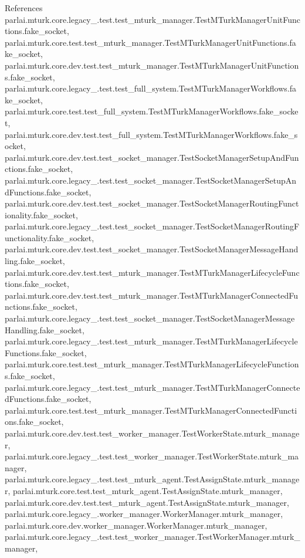 References parlai.\+mturk.\+core.\+legacy\+\_.\+test.\+test\+\_\+mturk\+\_\+manager.\+Test\+M\+Turk\+Manager\+Unit\+Functions.\+fake\+\_\+socket, parlai.\+mturk.\+core.\+test.\+test\+\_\+mturk\+\_\+manager.\+Test\+M\+Turk\+Manager\+Unit\+Functions.\+fake\+\_\+socket, parlai.\+mturk.\+core.\+dev.\+test.\+test\+\_\+mturk\+\_\+manager.\+Test\+M\+Turk\+Manager\+Unit\+Functions.\+fake\+\_\+socket, parlai.\+mturk.\+core.\+legacy\+\_.\+test.\+test\+\_\+full\+\_\+system.\+Test\+M\+Turk\+Manager\+Workflows.\+fake\+\_\+socket, parlai.\+mturk.\+core.\+test.\+test\+\_\+full\+\_\+system.\+Test\+M\+Turk\+Manager\+Workflows.\+fake\+\_\+socket, parlai.\+mturk.\+core.\+dev.\+test.\+test\+\_\+full\+\_\+system.\+Test\+M\+Turk\+Manager\+Workflows.\+fake\+\_\+socket, parlai.\+mturk.\+core.\+dev.\+test.\+test\+\_\+socket\+\_\+manager.\+Test\+Socket\+Manager\+Setup\+And\+Functions.\+fake\+\_\+socket, parlai.\+mturk.\+core.\+legacy\+\_.\+test.\+test\+\_\+socket\+\_\+manager.\+Test\+Socket\+Manager\+Setup\+And\+Functions.\+fake\+\_\+socket, parlai.\+mturk.\+core.\+dev.\+test.\+test\+\_\+socket\+\_\+manager.\+Test\+Socket\+Manager\+Routing\+Functionality.\+fake\+\_\+socket, parlai.\+mturk.\+core.\+legacy\+\_.\+test.\+test\+\_\+socket\+\_\+manager.\+Test\+Socket\+Manager\+Routing\+Functionality.\+fake\+\_\+socket, parlai.\+mturk.\+core.\+dev.\+test.\+test\+\_\+socket\+\_\+manager.\+Test\+Socket\+Manager\+Message\+Handling.\+fake\+\_\+socket, parlai.\+mturk.\+core.\+dev.\+test.\+test\+\_\+mturk\+\_\+manager.\+Test\+M\+Turk\+Manager\+Lifecycle\+Functions.\+fake\+\_\+socket, parlai.\+mturk.\+core.\+dev.\+test.\+test\+\_\+mturk\+\_\+manager.\+Test\+M\+Turk\+Manager\+Connected\+Functions.\+fake\+\_\+socket, parlai.\+mturk.\+core.\+legacy\+\_.\+test.\+test\+\_\+socket\+\_\+manager.\+Test\+Socket\+Manager\+Message\+Handling.\+fake\+\_\+socket, parlai.\+mturk.\+core.\+legacy\+\_.\+test.\+test\+\_\+mturk\+\_\+manager.\+Test\+M\+Turk\+Manager\+Lifecycle\+Functions.\+fake\+\_\+socket, parlai.\+mturk.\+core.\+test.\+test\+\_\+mturk\+\_\+manager.\+Test\+M\+Turk\+Manager\+Lifecycle\+Functions.\+fake\+\_\+socket, parlai.\+mturk.\+core.\+legacy\+\_.\+test.\+test\+\_\+mturk\+\_\+manager.\+Test\+M\+Turk\+Manager\+Connected\+Functions.\+fake\+\_\+socket, parlai.\+mturk.\+core.\+test.\+test\+\_\+mturk\+\_\+manager.\+Test\+M\+Turk\+Manager\+Connected\+Functions.\+fake\+\_\+socket, parlai.\+mturk.\+core.\+dev.\+test.\+test\+\_\+worker\+\_\+manager.\+Test\+Worker\+State.\+mturk\+\_\+manager, parlai.\+mturk.\+core.\+legacy\+\_.\+test.\+test\+\_\+worker\+\_\+manager.\+Test\+Worker\+State.\+mturk\+\_\+manager, parlai.\+mturk.\+core.\+legacy\+\_.\+test.\+test\+\_\+mturk\+\_\+agent.\+Test\+Assign\+State.\+mturk\+\_\+manager, parlai.\+mturk.\+core.\+test.\+test\+\_\+mturk\+\_\+agent.\+Test\+Assign\+State.\+mturk\+\_\+manager, parlai.\+mturk.\+core.\+dev.\+test.\+test\+\_\+mturk\+\_\+agent.\+Test\+Assign\+State.\+mturk\+\_\+manager, parlai.\+mturk.\+core.\+legacy\+\_.\+worker\+\_\+manager.\+Worker\+Manager.\+mturk\+\_\+manager, parlai.\+mturk.\+core.\+dev.\+worker\+\_\+manager.\+Worker\+Manager.\+mturk\+\_\+manager, parlai.\+mturk.\+core.\+legacy\+\_.\+test.\+test\+\_\+worker\+\_\+manager.\+Test\+Worker\+Manager.\+mturk\+\_\+manager, 